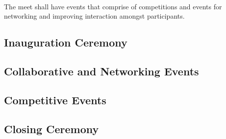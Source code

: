 \paragraph{}
The meet shall have events that comprise of competitions and events for networking and improving interaction amongst participants.

\subsection{Inauguration Ceremony}


\subsection{Collaborative and Networking Events}


\subsection{Competitive Events}


\subsection{Closing Ceremony}
